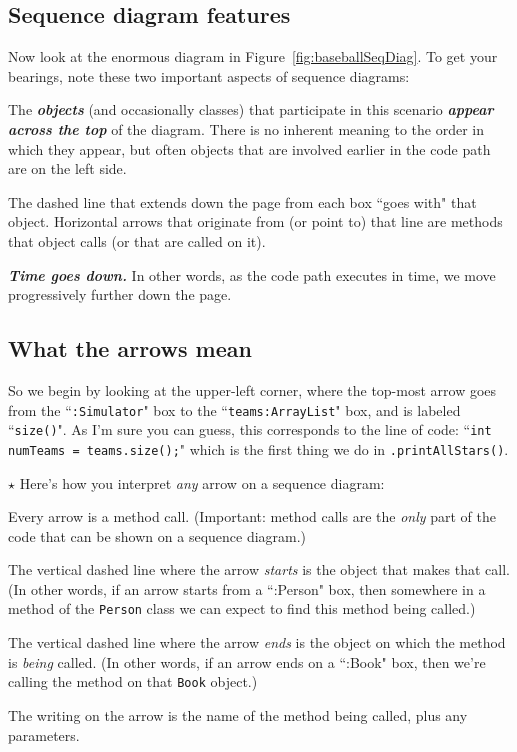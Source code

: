 \subsection{Sequence diagram features}

Now look at the enormous diagram in Figure~\ref{fig:baseballSeqDiag}. To get
your bearings, note these two important aspects of sequence diagrams:

\begin{compactitem}
\item The \textbf{\textit{objects}} (and occasionally classes) that
participate in this scenario \textbf{\textit{appear across the top}} of the
diagram. There is no inherent meaning to the order in which they appear, but
often objects that are involved earlier in the code path are on the left side.
\item The dashed line that extends down the page from each box ``goes with"
that object. Horizontal arrows that originate from (or point to) that line are
methods that object calls (or that are called on it).
\item \textit{\textbf{Time goes down.}} In other words, as the code path
executes in time, we move progressively further down the page.
\end{compactitem}

\subsection{What the arrows mean}

So we begin by looking at the upper-left corner, where the top-most arrow goes
from the ``\texttt{:Simulator}" box to the ``\texttt{teams:ArrayList}" box,
and is labeled ``\texttt{size()}". As I'm sure you can guess, this corresponds
to the line of code: ``\texttt{int numTeams = teams.size();}" which is the
first thing we do in \texttt{.printAllStars()}.

{\huge $\star$} Here's how you interpret \textit{any} arrow on a sequence diagram:

\begin{compactenum}
\item Every arrow is a method call. (Important: method calls are the
\textit{only} part of the code that can be shown on a sequence diagram.)
\item The vertical dashed line where the arrow \textit{starts} is the object
that makes that call. (In other words, if an arrow starts from a ``:Person"
box, then somewhere in a method of the \texttt{Person} class we can expect to
find this method being called.)
\item The vertical dashed line where the arrow \textit{ends} is the object on
which the method is \textit{being} called. (In other words, if an arrow ends
on a ``:Book" box, then we're calling the method on that \texttt{Book}
object.)
\item The writing on the arrow is the name of the method being called, plus
any parameters.
\end{compactenum}

